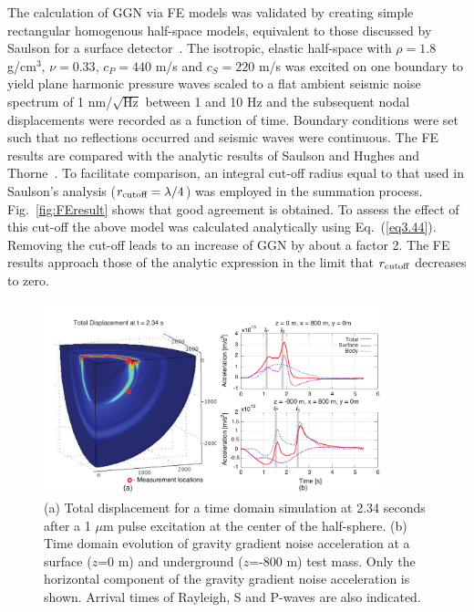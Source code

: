 The calculation of GGN via FE models was validated by creating simple rectangular homogenous half-space models, equivalent to those discussed by Saulson for a surface detector~\cite{GGSaulson}. The isotropic, elastic half-space with $\rho = 1.8$ g/cm$^3$, $\nu = 0.33$, $c_P = 440$ m/s and $c_S = 220$ m/s was excited on one boundary to yield plane harmonic pressure waves scaled to a flat ambient seismic noise spectrum of 1 nm/$\sqrt{\mbox{Hz}}$ between 1 and 10 Hz and the subsequent nodal displacements were recorded as a function of time. Boundary conditions were set such that no reflections occurred and seismic waves were continuous. The FE results are compared with the analytic results of Saulson and Hughes and Thorne~\cite{GGSaulson}\cite{GGThorne}. To facilitate comparison, an integral cut-off radius equal to that used in Saulson's analysis ($r_{\mbox{\scriptsize{cutoff}}} = \lambda/4$) was employed in the summation process. Fig.~\ref{fig:FEresult} shows that good agreement is obtained. To assess the effect of this cut-off the above model was calculated analytically using Eq.~(\ref{eq3.44}). Removing the cut-off leads to an increase of GGN by about a factor 2. The FE results approach those of the analytic expression in the limit that $r_{\mbox{\scriptsize{cutoff}}} $ decreases to zero. 
\begin{figure}[ht]
	\begin{center}
	\includegraphics[width=0.87\textwidth]{./Sec_SiteInfra/Figures/QS2Clay_paper.pdf}
	\caption{(a) Total displacement for a time domain simulation at 2.34 seconds after a 1 $\mu$m pulse excitation at the center of the half-sphere. (b) Time domain evolution of gravity gradient noise acceleration at a surface ($z$=0 m) and underground ($z$=-800 m) test mass. Only the horizontal component of the gravity gradient noise acceleration is shown. Arrival times of Rayleigh, S and P-waves are also indicated.}
		\label{fig:QS2Clay_paper}
	\end{center} 
\end{figure}

